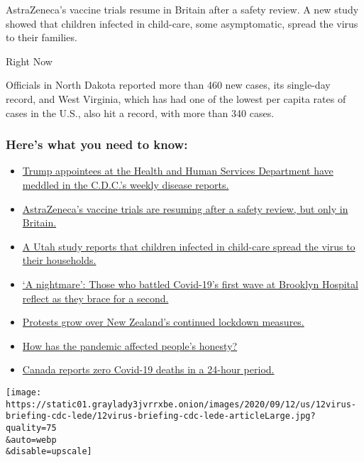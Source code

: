 AstraZeneca's vaccine trials resume in Britain after a safety review. A
new study showed that children infected in child-care, some
asymptomatic, spread the virus to their families.

Right Now

Officials in North Dakota reported more than 460 new cases, its
single-day record, and West Virginia, which has had one of the lowest
per capita rates of cases in the U.S., also hit a record, with more than
340 cases.

\hypertarget{heres-what-you-need-to-know}{%
\subsubsection{Here's what you need to
know:}\label{heres-what-you-need-to-know}}

\begin{itemize}
\tightlist
\item
  \protect\hyperlink{link-472a891e}{Trump appointees at the Health and
  Human Services Department have meddled in the C.D.C.'s weekly disease
  reports.}
\item
  \protect\hyperlink{link-42324357}{AstraZeneca's vaccine trials are
  resuming after a safety review, but only in Britain.}
\item
  \protect\hyperlink{link-5e5e617e}{A Utah study reports that children
  infected in child-care spread the virus to their households.}
\item
  \protect\hyperlink{link-4f963cde}{`A nightmare': Those who battled
  Covid-19's first wave at Brooklyn Hospital reflect as they brace for a
  second. }
\item
  \protect\hyperlink{link-5489dc38}{Protests grow over New Zealand's
  continued lockdown measures.}
\item
  \protect\hyperlink{link-6ba08dd2}{How has the pandemic affected
  people's honesty?}
\item
  \protect\hyperlink{link-2e6d7d13}{Canada reports zero Covid-19 deaths
  in a 24-hour period.}
\end{itemize}

\texttt{[image: https://static01.graylady3jvrrxbe.onion/images/2020/09/12/us/12virus-briefing-cdc-lede/12virus-briefing-cdc-lede-articleLarge.jpg?quality=75\\\&auto=webp\\\&disable=upscale]}

\subsection{}

